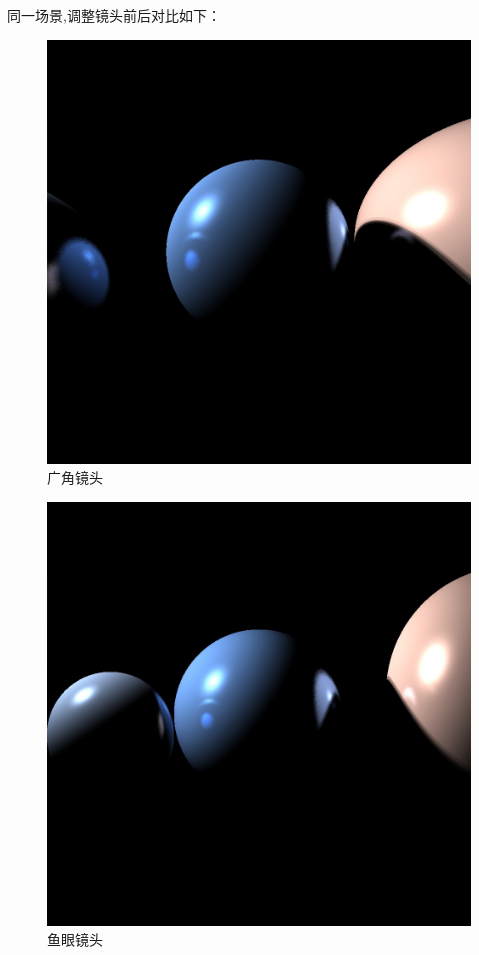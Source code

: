 \documentclass[10pt,twocolumn]{article}
\begin{document}
同一场景,调整镜头前后对比如下：
\begin{figure}[ht]
\centering
\includegraphics[scale=.2]{fig7.jpg}
\caption{广角镜头}
\end{figure}
\begin{figure}[ht]
\centering
\includegraphics[scale=.2]{fig8.jpg}
\caption{鱼眼镜头}
\end{figure}
\end{document}
